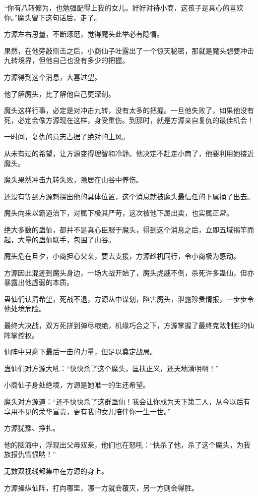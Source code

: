 \begin{this_body}
“你有八转修为，也勉强配得上我的女儿。好好对待小商，这孩子是真心的喜欢你。”魔头留下这句话后，走了。

方源左右思量，不断琢磨，觉得魔头此举必有隐情。

果然，在他旁敲侧击之后，小商仙子吐露出了一个惊天秘密，那就是魔头想要冲击九转境界，但他自己也没有多少的把握。

方源得到这个消息，大喜过望。

他了解魔头，比了解他自己更深刻。

魔头这样行事，必定是对冲击九转，没有太多的把握。一旦他失败了，如果他没有死，必定会像方源现在这样，身受重伤。到那时，就是方源亲自复仇的最佳机会！

一时间，复仇的意志占据了绝对的上风。

从未有过的希望，让方源变得理智和冷静。他决定不赶走小商了，他要利用她接近魔头。

魔头果然冲击九转失败，隐居在山谷中养伤。

还没有等到方源刺探出他的具体位置，这个消息就被魔头最信任的下属捅了出去。

魔头向来以霸道治下，对属下极其严苛，这次被他下属出卖，也实属正常。

绝大多数的蛊仙，都并不是真心臣服于魔头，得到这个消息之后，立即五域揭竿而起，大量的蛊仙联手，包围了山谷。

魔头危在旦夕，小商担心父亲，要去支援，方源趁机同行，令小商极为感动。

方源因此混迹到魔头身边，一场大战开始了，魔头虎威不倒，杀死许多蛊仙，但亦暴露出他虚弱的本质。

蛊仙们认清希望，死战不退，方源从中谋划，陷害魔头，泄露珍贵情报，一步步令他处境危险。

最终大决战，双方死拼到弹尽粮绝，机缘巧合之下，方源掌握了最终克敌制胜的仙阵掌控权。

仙阵中只剩下最后一击的力量，但足以奠定战局。

蛊仙们对方源大吼：“快快杀了这个魔头，匡扶正义，还天地清明啊！”

小商仙子身处绝境，方源是她唯一的生还希望。

魔头对方源道：“还不快快杀了这群蛊仙！我会让你成为天下第二人，从今以后有享用不见的荣华富贵，更有我的女儿陪伴你一生一世。”

方源犹豫、挣扎。

他的脑海中，浮现出父母双亲，他们也在怒吼：“快杀了他，杀了这个魔头，为我族报仇雪恨呐！”

无数双视线都集中在方源的身上。

方源操纵仙阵，打向哪里，哪一方就会覆灭，另一方则会得胜。


\end{this_body}
